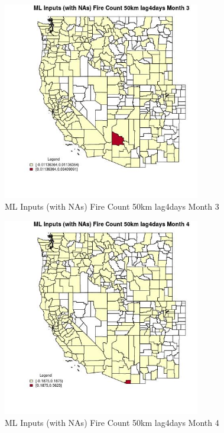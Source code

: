 \begin{figure} 
\centering  
\includegraphics[width=0.77\textwidth]{Code_Outputs/Report_ML_input_PM25_Step4_part_e_de_duplicated_aves_compiled_2019-05-21wNAs_CountyFire_Count_50km_lag4daysmedianMonth3.jpg} 
\caption{\label{fig:Report_ML_input_PM25_Step4_part_e_de_duplicated_aves_compiled_2019-05-21wNAsCountyFire_Count_50km_lag4daysmedianMonth3}ML Inputs (with NAs) Fire Count 50km lag4days Month 3} 
\end{figure} 
 

\begin{figure} 
\centering  
\includegraphics[width=0.77\textwidth]{Code_Outputs/Report_ML_input_PM25_Step4_part_e_de_duplicated_aves_compiled_2019-05-21wNAs_CountyFire_Count_50km_lag4daysmedianMonth4.jpg} 
\caption{\label{fig:Report_ML_input_PM25_Step4_part_e_de_duplicated_aves_compiled_2019-05-21wNAsCountyFire_Count_50km_lag4daysmedianMonth4}ML Inputs (with NAs) Fire Count 50km lag4days Month 4} 
\end{figure} 
 

